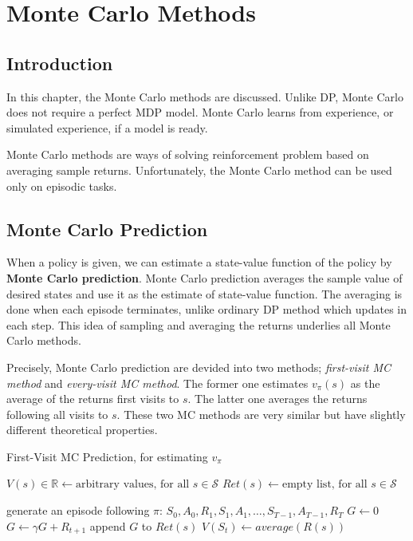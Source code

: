 \documentclass[../../main.tex]{subfiles}
\begin{document}
\chapter{Monte Carlo Methods}

\section{Introduction}
    In this chapter, the Monte Carlo methods are discussed. Unlike DP, Monte Carlo does not
    require a perfect MDP model. Monte Carlo learns from experience, or simulated experience,
    if a model is ready.

    Monte Carlo methods are ways of solving reinforcement problem based on averaging sample returns.
    Unfortunately, the Monte Carlo method can be used only on episodic tasks.

\section{Monte Carlo Prediction}
    When a policy is given, we can estimate a state-value function of the policy by \textbf{Monte Carlo prediction}.
    Monte Carlo prediction averages the sample value of desired states and use it as the estimate of state-value function.
    The averaging is done when each episode terminates, unlike ordinary DP method which updates in each step.
    This idea of sampling and averaging the returns underlies all Monte Carlo methods.

    Precisely, Monte Carlo prediction are devided into two methods; \emph{first-visit MC method} and \emph{every-visit MC method}.
    The former one estimates $v_\pi(s)$ as the average of the returns first visits to $s$. The latter one averages the returns following all visits to $s$.
    These two MC methods are very similar but have slightly different theoretical properties.

    {First-Visit MC Prediction, for estimating $v_\pi$}
    {}
    {}
    {
        $V(s) \in \mathbb{R} \leftarrow \text{arbitrary values, for all } s \in \mathcal{S}$\;
        $Ret(s) \leftarrow \text{empty list, for all } s \in \mathcal{S}$\;

        {
            generate an episode following $\pi$: $S_0, A_0, R_1, S_1, A_1, \dots, S_{T-1}, A_{T-1}, R_T$\;
            $G \leftarrow 0$\;
            {
                $G \leftarrow \gamma G + R_{t+1}$\;
                {
                    append $G$ to $Ret(s)$\;
                    $V(S_t) \leftarrow average(R(s))$\;
                }
            }
        }
    }
\end{document}
